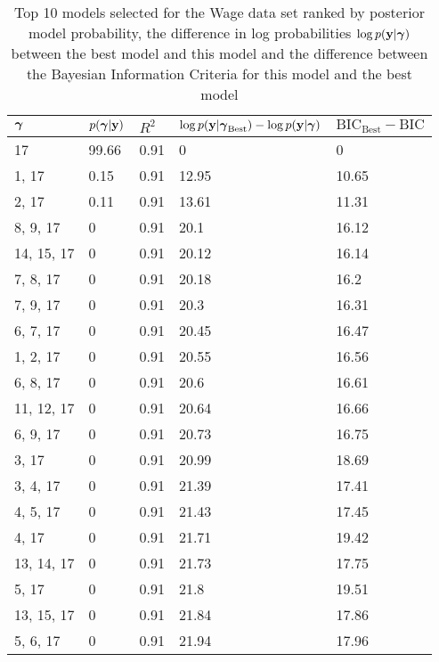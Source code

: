 \documentclass{amsart}
\begin{document}
\begin{table}
\label{tab:numerical_results_wage}
\caption{Top 10 models selected for the Wage data set ranked by posterior model probability, the difference
					in log probabilities $\log p({\bf y}|{\boldsymbol \gamma})$ between the best model and this model and the difference
					between the Bayesian Information Criteria for this model and the best model}
\begin{tabular}{|l|llll|}
\hline
${\boldsymbol \gamma}$ & $p({\boldsymbol \gamma}|{\bf y})$ & $R^2$ & $\log p({\bf y} | {\boldsymbol \gamma}_\text{Best}) - \log p({\bf y} | {\boldsymbol \gamma})$ & $\text{BIC}_\text{Best} - \text{BIC}$ \\
\hline
17&  99.66&  0.91&  0&  0\\
1, 17&  0.15&  0.91&  12.95&  10.65\\
2, 17&  0.11&  0.91&  13.61&  11.31\\
8, 9, 17&  0&  0.91&  20.1&  16.12\\
14, 15, 17&  0&  0.91&  20.12&  16.14\\
7, 8, 17&  0&  0.91&  20.18&  16.2\\
7, 9, 17&  0&  0.91&  20.3&  16.31\\
6, 7, 17&  0&  0.91&  20.45&  16.47\\
1, 2, 17&  0&  0.91&  20.55&  16.56\\
6, 8, 17&  0&  0.91&  20.6&  16.61\\
11, 12, 17&  0&  0.91&  20.64&  16.66\\
6, 9, 17&  0&  0.91&  20.73&  16.75\\
3, 17&  0&  0.91&  20.99&  18.69\\
3, 4, 17&  0&  0.91&  21.39&  17.41\\
4, 5, 17&  0&  0.91&  21.43&  17.45\\
4, 17&  0&  0.91&  21.71&  19.42\\
13, 14, 17&  0&  0.91&  21.73&  17.75\\
5, 17&  0&  0.91&  21.8&  19.51\\
13, 15, 17&  0&  0.91&  21.84&  17.86\\
5, 6, 17&  0&  0.91&  21.94&  17.96\\
\hline
\end{tabular}
\end{table}
\end{document}
